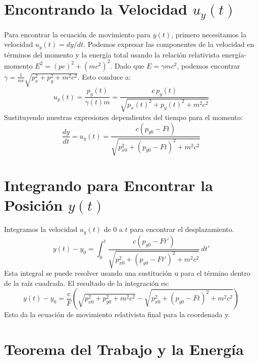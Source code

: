 \documentclass[11pt,a4paper]{book}
\begin{document}
\section{Encontrando la Velocidad \texorpdfstring{$u_y(t)$}{uy(t)}}
Para encontrar la ecuación de movimiento para $y(t)$, primero necesitamos la velocidad $u_y(t) = dy/dt$. Podemos expresar las componentes de la velocidad en términos del momento y la energía total usando la relación relativista energía-momento $E^2 = (pc)^2 + (mc^2)^2$. Dado que $E=\gamma m c^2$, podemos encontrar $\gamma = \frac{1}{mc}\sqrt{p_x^2 + p_y^2 + m^2c^2}$. Esto conduce a:
\[ u_y(t) = \frac{p_y(t)}{\gamma(t) m} = \frac{c \, p_y(t)}{\sqrt{p_x(t)^2 + p_y(t)^2 + m^2c^2}} \]
Sustituyendo nuestras expresiones dependientes del tiempo para el momento:
\[ \frac{dy}{dt} = u_y(t) = \frac{c (p_{y0} - Ft)}{\sqrt{p_{x0}^2 + (p_{y0} - Ft)^2 + m^2c^2}} \]

\section{Integrando para Encontrar la Posición \texorpdfstring{$y(t)$}{y(t)}}
Integramos la velocidad $u_y(t)$ de $0$ a $t$ para encontrar el desplazamiento.
\[ y(t) - y_0 = \int_0^t \frac{c (p_{y0} - Ft')}{\sqrt{p_{x0}^2 + (p_{y0} - Ft')^2 + m^2c^2}} \, dt' \]
Esta integral se puede resolver usando una sustitución u para el término dentro de la raíz cuadrada. El resultado de la integración es:
\[ y(t) - y_0 = \frac{c}{F} \left( \sqrt{p_{x0}^2 + p_{y0}^2 + m^2c^2} - \sqrt{p_{x0}^2 + (p_{y0} - Ft)^2 + m^2c^2} \right) \]
Esto da la ecuación de movimiento relativista final para la coordenada y.

\section{Teorema del Trabajo y la Energía}
\end{document}
